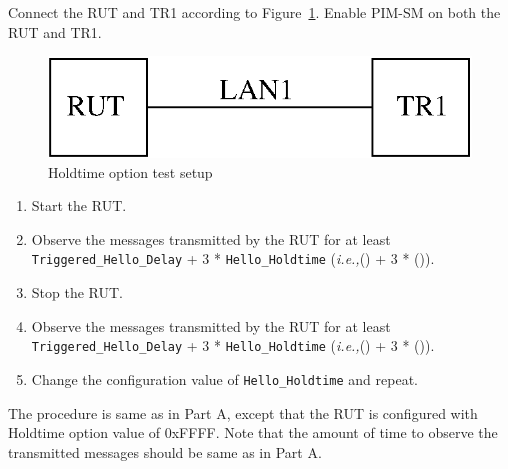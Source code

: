 \documentclass[11pt]{report}
\newcommand{\ie}{\emph{i.e.,}\xspace}
\begin{document}
Connect the RUT and TR1 according to Figure~\ref{fig:holdtime_option}.
Enable PIM-SM on both the RUT and TR1.

\begin{figure}[htbp]
  \begin{center}
    \includegraphics[scale=0.8]{figs/pim_test_2_4_holdtime_option}
    \caption{Holdtime option test setup}
    \label{fig:holdtime_option}
  \end{center}
\end{figure}



\begin{enumerate}

  \item Start the RUT.

  \item Observe the messages transmitted by the RUT for at least
        \verb=Triggered_Hello_Delay= + 3 * \verb=Hello_Holdtime=
        (\ie ({\PimsmTriggeredHelloDelay}) + 3 * ({\PimsmHelloHoldtime})).

  \item Stop the RUT.

  \item Observe the messages transmitted by the RUT for at least
        \verb=Triggered_Hello_Delay= + 3 * \verb=Hello_Holdtime=
        (\ie ({\PimsmTriggeredHelloDelay}) + 3 * ({\PimsmHelloHoldtime})).

  \item Change the configuration value of \verb=Hello_Holdtime= and repeat.

\end{enumerate}


The procedure is same as in Part A, except that the RUT is configured with
Holdtime option value of 0xFFFF. Note that the amount of time to observe the
transmitted messages should be same as in Part A.
\end{document}
